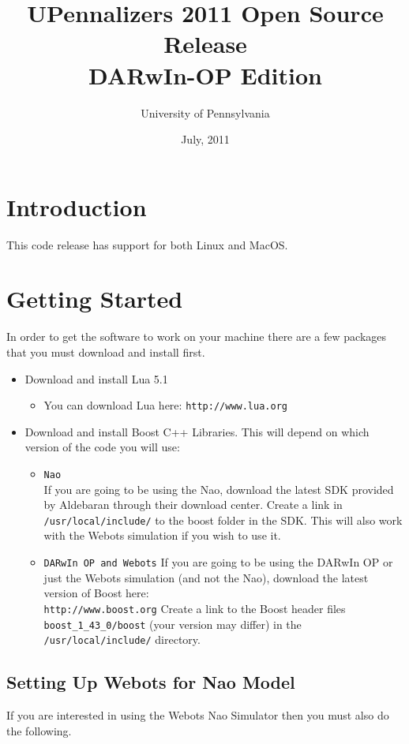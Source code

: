 \documentclass{article}
\begin{document}
\title{UPennalizers  2011 Open Source Release\\ DARwIn-OP Edition}
\date{July, 2011}
\author{University of Pennsylvania}
\maketitle


\section{Introduction}
  This code release has support for both Linux and MacOS.

\section{Getting Started}
  In order to get the software to work on your machine there are a few packages that you must download and install first.

  \begin{itemize}
    \item Download and install Lua 5.1
    \begin{itemize}
      \item You can download Lua here: \texttt{http://www.lua.org}
    \end{itemize}
    \item Download and install Boost C++ Libraries. This will depend on which version of the code you will use:
    \begin{itemize}
      \item \texttt{Nao} \\
        If you are going to be using the Nao, download the latest SDK provided by Aldebaran through their download center. Create a link in \texttt{/usr/local/include/} to the boost folder in the SDK. This will also work with the Webots simulation if you wish to use it.
      \item \texttt{DARwIn OP and Webots}
        If you are going to be using the DARwIn OP or just the Webots simulation (and not the Nao), download the latest version of Boost here:\\
        \texttt{http://www.boost.org}
        Create a link to the Boost header files \texttt{boost\_1\_43\_0/boost} (your version may differ) in the \texttt{/usr/local/include/} directory.
    \end{itemize}
  \end{itemize}

  \subsection{Setting Up Webots for Nao Model}
    If you are interested in using the Webots Nao Simulator then you must also do the following.
\end{document}
